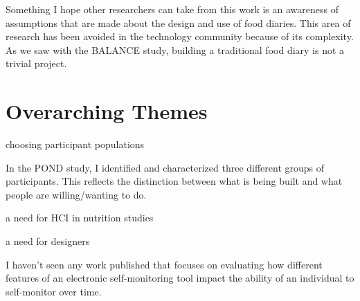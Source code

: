 Something I hope other researchers can take from this work is an awareness of assumptions that are made about the design and use of food diaries. This area of research has been avoided in the technology community because of its complexity. As we saw with the BALANCE study, building a traditional food diary is not a trivial project. 

\section{Overarching Themes}
\begin{itemize*}
\item choosing participant populations
\item In the POND study, I identified and characterized three different groups of participants. This reflects the distinction between what is being built and what people are willing/wanting to do. 
\item a need for HCI in nutrition studies
\item a need for designers 
\item I haven't seen any work published that focuses on evaluating how different features of an electronic self-monitoring tool impact the ability of an individual to self-monitor over time. 
\end{itemize*}



